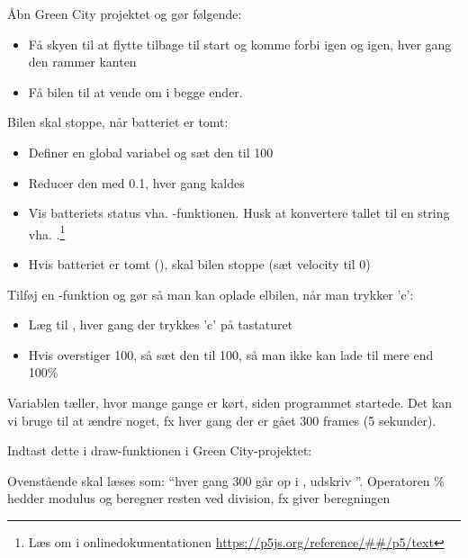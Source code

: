 \documentclass{ucph-handout}
\begin{document}
\begin{exercisebox}[adjusted title=Flere opgaver om betingelser]
Åbn Green City projektet og gør følgende:
\begin{itemize}
\item Få skyen til at flytte tilbage til start og komme forbi igen og
  igen, hver gang den rammer kanten
\item Få bilen til at vende om i begge ender.
\end{itemize}

Bilen skal stoppe, når batteriet er tomt:
  \begin{itemize}
  \item Definer en global variabel  og sæt den til 100
  \item Reducer den med 0.1, hver gang  kaldes
  \item Vis batteriets status vha. -funktionen.
    Husk at konvertere tallet til en string vha. .\footnote{Læs om  i
      onlinedokumentationen
      \url{https://p5js.org/reference/##/p5/text}}
  \item Hvis batteriet er tomt (), skal bilen stoppe (sæt velocity til 0)
  \end{itemize}

\noindent
Tilføj en -funktion og gør så man kan oplade elbilen, når man trykker 'c':
\begin{itemize}
  \item Læg  til , hver gang der
    trykkes 'c' på tastaturet
  \item Hvis  overstiger 100, så sæt den til
    100, så man ikke kan lade til mere end 100\%
\end{itemize}


Variablen  tæller, hvor mange gange  er
kørt, siden programmet startede. Det kan vi bruge til at ændre noget, fx
hver gang der er gået 300 frames (5 sekunder).

\noindent
Indtast dette i draw-funktionen i Green City-projektet:


\noindent
Ovenstående skal læses som: ``hver gang 300 går op i
, udskriv ''. Operatoren \% hedder
modulus og beregner resten ved division, fx giver beregningen
\ttpy{5 %
\\

}
\end{exercisebox}
\end{document}
